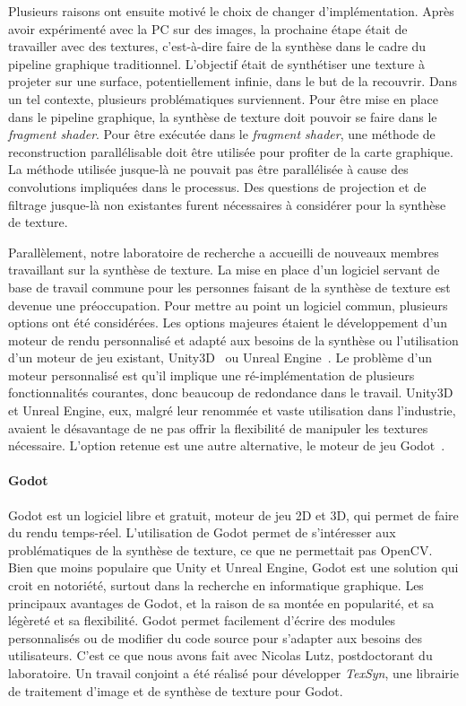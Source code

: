 \bigskip

Plusieurs raisons ont ensuite motivé le choix de changer d'implémentation. Après avoir expérimenté avec la PC sur des images, la prochaine étape était de travailler avec des textures, c'est-à-dire faire de la synthèse dans le cadre du pipeline graphique traditionnel. L'objectif était de synthétiser une texture à projeter sur une surface, potentiellement infinie, dans le but de la recouvrir. Dans un tel contexte, plusieurs problématiques surviennent. Pour être mise en place dans le pipeline graphique, la synthèse de texture doit pouvoir se faire dans le \textit{fragment shader}. Pour être exécutée dans le \textit{fragment shader}, une méthode de reconstruction parallélisable doit être utilisée pour profiter de la carte graphique. La méthode utilisée jusque-là ne pouvait pas être parallélisée à cause des convolutions impliquées dans le processus. Des questions de projection et de filtrage jusque-là non existantes furent nécessaires à considérer pour la synthèse de texture.

\bigskip

Parallèlement, notre laboratoire de recherche a accueilli de nouveaux membres travaillant sur la synthèse de texture. La mise en place d'un logiciel servant de base de travail commune pour les personnes faisant de la synthèse de texture est devenue une préoccupation. Pour mettre au point un logiciel commun, plusieurs options ont été considérées. Les options majeures étaient le développement d'un moteur de rendu personnalisé et adapté aux besoins de la synthèse ou l'utilisation d'un moteur de jeu existant, Unity3D~\cite{unity_engine} ou Unreal Engine~\cite{unreal_engine}. Le problème d'un moteur personnalisé est qu'il implique une ré-implémentation de plusieurs fonctionnalités courantes, donc beaucoup de redondance dans le travail. Unity3D et Unreal Engine, eux, malgré leur renommée et vaste utilisation dans l'industrie, avaient le désavantage de ne pas offrir la flexibilité de manipuler les textures nécessaire. L'option retenue est une autre alternative, le moteur de jeu Godot~\cite{godot_game_engine}.

\paragraph{Godot}

Godot est un logiciel libre et gratuit, moteur de jeu 2D et 3D, qui permet de faire du rendu temps-réel. L'utilisation de Godot permet de s'intéresser aux problématiques de la synthèse de texture, ce que ne permettait pas OpenCV. Bien que moins populaire que Unity et Unreal Engine, Godot est une solution qui croit en notoriété, surtout dans la recherche en informatique graphique. Les principaux avantages de Godot, et la raison de sa montée en popularité, et sa légèreté et sa flexibilité. Godot permet facilement d'écrire des modules personnalisés ou de modifier du code source pour s'adapter aux besoins des utilisateurs. C'est ce que nous avons fait avec Nicolas Lutz, postdoctorant du laboratoire. Un travail conjoint a été réalisé pour développer \textit{TexSyn}, une librairie \cpp de traitement d'image et de synthèse de texture pour Godot.


